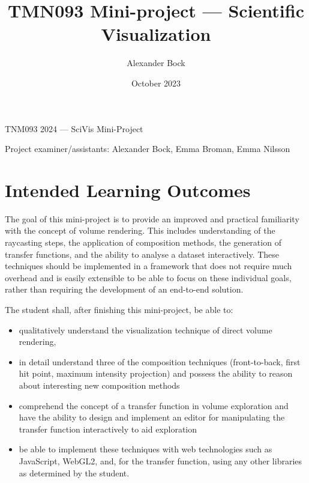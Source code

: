 \documentclass{labinstructions}
\begin{document}
\setcounter{page}{1}

\pagestyle{empty}


%
%
\begin{center}
{\Huge TNM093 2024 --- SciVis Mini-Project}
\vspace{0.6cm}

\Large{Project examiner/assistants: Alexander Bock, Emma Broman, Emma Nilsson}
\end{center}

\title{TMN093 Mini-project --- Scientific Visualization}
\author{Alexander Bock}
\date{October 2023}

\pagestyle{fancy}
\fancyfoot[c]{}
\fancyfoot[R]{\thepage}

\section{Intended Learning Outcomes}
The goal of this mini-project is to provide an improved and practical familiarity with the concept of volume rendering.  This includes understanding of the raycasting steps, the application of composition methods, the generation of transfer functions, and the ability to analyse a dataset interactively.  These techniques should be implemented in a framework that does not require much overhead and is easily extensible to be able to focus on these individual goals, rather than requiring the development of an end-to-end solution.

The student shall, after finishing this mini-project, be able to:
\begin{itemize}
  \item qualitatively understand the visualization technique of direct volume rendering,
  \item in detail understand three of the composition techniques (front-to-back, first hit point, maximum intensity projection) and possess the ability to reason about interesting new composition methods
  \item comprehend the concept of a transfer function in volume exploration and have the ability to design and implement an editor for manipulating the transfer function interactively to aid exploration
  \item be able to implement these techniques with web technologies such as JavaScript, WebGL2, and, for the transfer function, using any other libraries as determined by the student.
\end{itemize}{}
\end{document}
